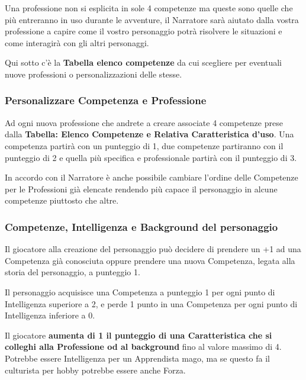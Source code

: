 \begin{multicols}{2}

Una professione non si esplicita in sole 4 competenze ma queste sono quelle che più entreranno in uso durante le avventure, il Narratore sarà aiutato dalla vostra professione a capire come il vostro personaggio potrà risolvere le situazioni e come interagirà con gli altri personaggi.

Qui sotto c'è la \textbf{Tabella elenco competenze} da cui scegliere per eventuali nuove professioni o personalizzazioni delle stesse.

\subsubsection{Personalizzare Competenza e Professione}

Ad ogni nuova professione che andrete a creare associate 4 competenze prese dalla \textbf{Tabella: Elenco Competenze e Relativa Caratteristica d'uso}. Una competenza partirà con un punteggio di 1, due competenze partiranno con il punteggio di 2 e quella più specifica e professionale partirà con il punteggio di 3.

In accordo con il Narratore è anche possibile cambiare l'ordine delle Competenze per le Professioni già elencate rendendo più capace il personaggio in alcune competenze piuttosto che altre.

\subsubsection{Competenze, Intelligenza e Background del personaggio}\label{quintacompetenza}

Il giocatore alla creazione del personaggio può decidere di prendere un +1 ad una Competenza già conosciuta oppure prendere una nuova Competenza, legata alla storia del personaggio, a punteggio 1.

Il personaggio acquisisce una Competenza a punteggio 1 per ogni punto di Intelligenza superiore a 2, e perde 1 punto in una Competenza per ogni punto di Intelligenza inferiore a 0.

\medskip

Il giocatore \textbf{aumenta di 1 il punteggio di una Caratteristica che si colleghi alla Professione od al background} fino al valore massimo di 4. Potrebbe essere Intelligenza per un Apprendista mago, ma se questo fa il culturista per hobby potrebbe essere anche Forza.


\end{multicols}
